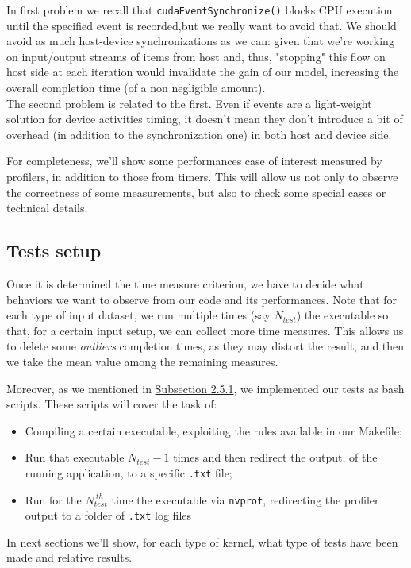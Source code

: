 In first problem we recall that \texttt{cudaEventSynchronize()} blocks CPU execution until the specified event is recorded,but we really want to avoid that.
We should avoid as much host-device synchronizations as we can: given that we're working on input/output streams of items from host and, thus, "stopping" this flow on host side at each iteration would invalidate the gain of our model, increasing the overall completion time (of a non negligible amount).\\
The second problem is related to the first. Even if events are a light-weight solution for device activities timing, it doesn't mean they don't introduce a bit of overhead (in addition to the synchronization one) in both host and device side.

For completeness, we'll show some performances case of interest measured by profilers, in addition to those from timers.
This will allow us not only to observe the correctness of some measurements, but also to check some special cases or technical details.


\subsection{Tests setup}
Once it is determined the time measure criterion, we have to decide what behaviors we want to observe from our code and its performances.
Note that for each type of input dataset, we run multiple times (say \(N_{test}\)) the executable so that, for a certain input setup, we can collect more time measures. This allows us to delete some \textit{outliers} completion times, as they may distort the result, and then we take the mean value among the remaining measures.

Moreover, as we mentioned in \hyperref[subs:bash]{Subsection 2.5.1}, we implemented our tests as bash scripts.
These scripts will cover the task of:
\begin{itemize}
	\item Compiling a certain executable, exploiting the rules available in our Makefile;
	\item Run that executable \(N_{test} - 1\) times and then redirect the output, of the running application, to a specific \texttt{.txt} file;
	\item Run for the \(N_{test}^{\ th}\) time the executable via \texttt{nvprof}, redirecting the profiler output to a folder of \texttt{.txt} log files
\end{itemize} 
In next sections we'll show, for each type of kernel, what type of tests have been made and relative results.

